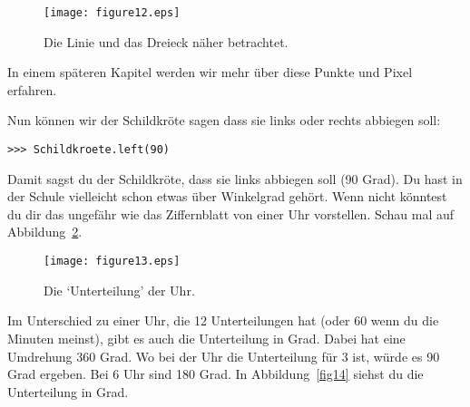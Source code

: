 \begin{figure}
\begin{center}
\texttt{[image: figure12.eps]}
\end{center}
\caption{Die Linie und das Dreieck näher betrachtet.}\label{fig12}
\end{figure}

In einem späteren Kapitel werden wir mehr über diese Punkte und Pixel erfahren.

Nun können wir der Schildkröte sagen dass sie links oder rechts  abbiegen soll:

\begin{listing}
\begin{verbatim}
>>> Schildkroete.left(90)
\end{verbatim}
\end{listing}

Damit sagst du der Schildkröte, dass sie links abbiegen soll (90 Grad). Du hast in der Schule vielleicht schon etwas über Winkelgrad gehört. Wenn nicht könntest du dir das ungefähr wie das Ziffernblatt von einer Uhr vorstellen. Schau mal auf Abbildung~\ref{fig13}.

\begin{figure}
\begin{center}
\texttt{[image: figure13.eps]}
\end{center}
\caption{Die `Unterteilung' der Uhr.}\label{fig13}
\end{figure}

Im Unterschied zu einer Uhr, die 12 Unterteilungen hat (oder 60 wenn du die Minuten meinst), gibt es auch die Unterteilung in Grad. Dabei hat eine Umdrehung 360 Grad. Wo bei der Uhr die Unterteilung für 3 ist, würde es 90 Grad ergeben. Bei 6 Uhr sind 180 Grad. In Abbildung~\ref{fig14} siehst du die Unterteilung in Grad.

